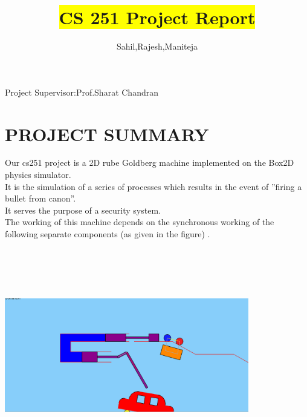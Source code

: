\documentclass{article}
\title{\colorbox{yellow}{CS 251 Project Report}}
\author{Sahil,Rajesh,Maniteja}
\begin{document}
\maketitle
\hfill
\begin{table}[h]
	\begin{center}
	\end{center}
\end{table}
\begin{center}
\section*{}
\large{
              Project Supervisor:{\huge Prof.Sharat Chandran }           
}
\end{center}

\clearpage
\section*{\huge{PROJECT SUMMARY}}
\large{
Our cs251 project is a 2D rube Goldberg machine implemented on the Box2D physics simulator.\\
 It is the simulation of a series of processes which results in the event of ”firing a bullet from canon”.\\
It serves the purpose of a security system.\\
 The working of this machine depends on the synchronous working of the following separate components (as given in the figure) .\\
\\
\\
\includegraphics[width=0.8\textwidth, height=80mm]{1.png}
}
\end{document}
